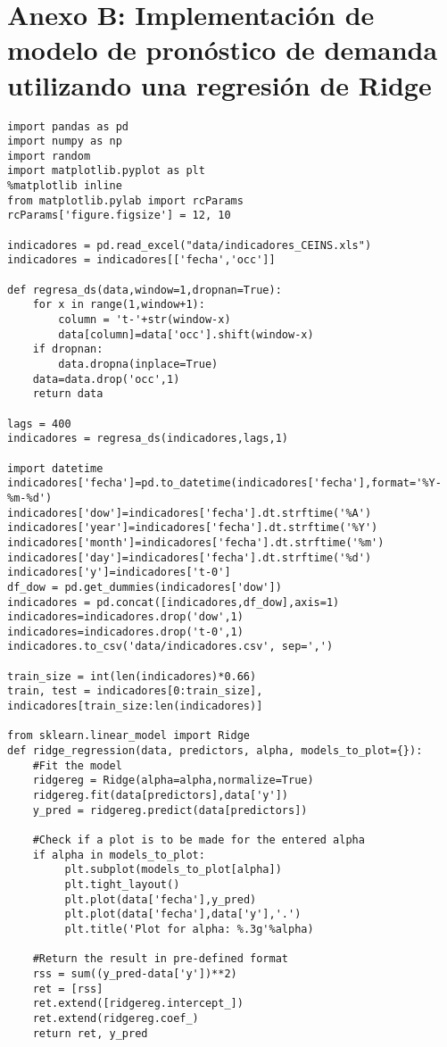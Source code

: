 \chapter{Anexo B: Implementación de modelo de pronóstico de demanda utilizando una regresión de Ridge}
\label{ch:anexob}

\begin{verbatim}
import pandas as pd
import numpy as np
import random
import matplotlib.pyplot as plt
%matplotlib inline
from matplotlib.pylab import rcParams
rcParams['figure.figsize'] = 12, 10

indicadores = pd.read_excel("data/indicadores_CEINS.xls")
indicadores = indicadores[['fecha','occ']]

def regresa_ds(data,window=1,dropnan=True):
    for x in range(1,window+1):
        column = 't-'+str(window-x)
        data[column]=data['occ'].shift(window-x)
    if dropnan:
        data.dropna(inplace=True)
    data=data.drop('occ',1)
    return data
    
lags = 400
indicadores = regresa_ds(indicadores,lags,1)

import datetime
indicadores['fecha']=pd.to_datetime(indicadores['fecha'],format='%Y-%m-%d')
indicadores['dow']=indicadores['fecha'].dt.strftime('%A')
indicadores['year']=indicadores['fecha'].dt.strftime('%Y')
indicadores['month']=indicadores['fecha'].dt.strftime('%m')
indicadores['day']=indicadores['fecha'].dt.strftime('%d')
indicadores['y']=indicadores['t-0']
df_dow = pd.get_dummies(indicadores['dow'])
indicadores = pd.concat([indicadores,df_dow],axis=1)
indicadores=indicadores.drop('dow',1)
indicadores=indicadores.drop('t-0',1)
indicadores.to_csv('data/indicadores.csv', sep=',')

train_size = int(len(indicadores)*0.66)
train, test = indicadores[0:train_size], indicadores[train_size:len(indicadores)]

from sklearn.linear_model import Ridge
def ridge_regression(data, predictors, alpha, models_to_plot={}):
    #Fit the model
    ridgereg = Ridge(alpha=alpha,normalize=True)
    ridgereg.fit(data[predictors],data['y'])
    y_pred = ridgereg.predict(data[predictors])
    
    #Check if a plot is to be made for the entered alpha
    if alpha in models_to_plot:
         plt.subplot(models_to_plot[alpha])
         plt.tight_layout()
         plt.plot(data['fecha'],y_pred)
         plt.plot(data['fecha'],data['y'],'.')
         plt.title('Plot for alpha: %.3g'%alpha)
    
    #Return the result in pre-defined format
    rss = sum((y_pred-data['y'])**2)
    ret = [rss]
    ret.extend([ridgereg.intercept_])
    ret.extend(ridgereg.coef_)
    return ret, y_pred
    

\end{verbatim}
